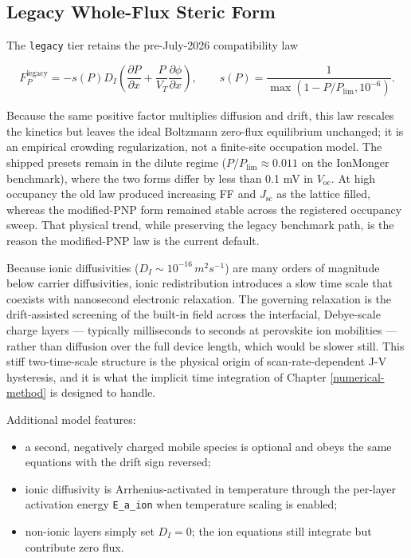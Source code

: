 \documentclass[
  11pt,
  american,
]{report}
\providecommand{\tightlist}{%
  \setlength{\itemsep}{0pt}\setlength{\parskip}{0pt}}
\begin{document}
\hypertarget{legacy-whole-flux-steric-form}{%
\subsection{Legacy Whole-Flux Steric
Form}\label{legacy-whole-flux-steric-form}}

The \texttt{legacy} tier retains the pre-July-2026 compatibility law

\begin{equation}
\label{eq:ion-flux-legacy}
F_P^\mathrm{legacy}
=-s(P)D_I\left(
\frac{\partial P}{\partial x}
+\frac{P}{V_T}\frac{\partial\phi}{\partial x}
\right),
\qquad
s(P)=\frac{1}{\max(1-P/P_\mathrm{lim},10^{-6})}.
\end{equation}

Because the same positive factor multiplies diffusion and drift, this
law rescales the kinetics but leaves the ideal Boltzmann zero-flux
equilibrium unchanged; it is an empirical crowding regularization, not a
finite-site occupation model. The shipped presets remain in the dilute
regime (\(P/P_\mathrm{lim}\approx0.011\) on the IonMonger benchmark),
where the two forms differ by less than 0.1 mV in \(V_\mathrm{oc}\). At
high occupancy the old law produced increasing FF and \(J_\mathrm{sc}\)
as the lattice filled, whereas the modified-PNP form remained stable
across the registered occupancy sweep. That physical trend, while
preserving the legacy benchmark path, is the reason the modified-PNP law
is the current default.

Because ionic diffusivities (\(D_I \sim 10^{-16}\,m^2 s^{-1}\)) are many
orders of magnitude below carrier diffusivities, ionic redistribution
introduces a slow time scale that coexists with nanosecond electronic
relaxation. The governing relaxation is the drift-assisted screening of
the built-in field across the interfacial, Debye-scale charge layers ---
typically milliseconds to seconds at perovskite ion mobilities ---
rather than diffusion over the full device length, which would be slower
still. This stiff two-time-scale structure is the physical origin of
scan-rate-dependent J-V hysteresis, and it is what the implicit time
integration of Chapter \ref{numerical-method} is designed to handle.

Additional model features:

\begin{itemize}
\tightlist
\item
  a second, negatively charged mobile species is optional and obeys the
  same equations with the drift sign reversed;
\item
  ionic diffusivity is Arrhenius-activated in temperature through the
  per-layer activation energy \texttt{E\_a\_ion} when temperature
  scaling is enabled;
\item
  non-ionic layers simply set \(D_I = 0\); the ion equations still
  integrate but contribute zero flux.
\end{itemize}
\end{document}
